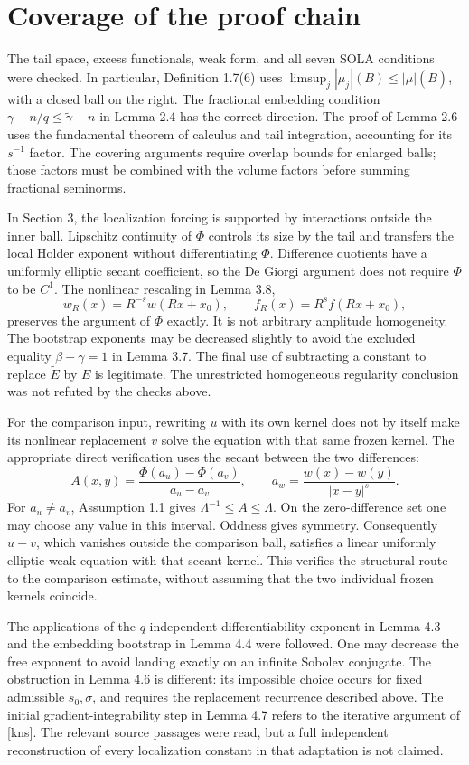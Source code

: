 \documentclass[10pt]{article}
\begin{document}
\section*{Coverage of the proof chain}
The tail space, excess functionals, weak form, and all seven SOLA conditions were checked. In particular, Definition 1.7(6) uses \(\limsup_j|\mu_j|(B)\leq|\mu|(\overline B)\), with a closed ball on the right. The fractional embedding condition \(\gamma-n/q\leq\widetilde\gamma-n\) in Lemma 2.4 has the correct direction. The proof of Lemma 2.6 uses the fundamental theorem of calculus and tail integration, accounting for its \(s^{-1}\) factor. The covering arguments require overlap bounds for enlarged balls; those factors must be combined with the volume factors before summing fractional seminorms.\par
In Section 3, the localization forcing is supported by interactions outside the inner ball. Lipschitz continuity of \(\Phi\) controls its size by the tail and transfers the local Holder exponent without differentiating \(\Phi\). Difference quotients have a uniformly elliptic secant coefficient, so the De Giorgi argument does not require \(\Phi\) to be \(C^1\). The nonlinear rescaling in Lemma 3.8, \[w_R(x)=R^{-s}w(Rx+x_0),\qquad f_R(x)=R^sf(Rx+x_0),\] preserves the argument of \(\Phi\) exactly. It is not arbitrary amplitude homogeneity. The bootstrap exponents may be decreased slightly to avoid the excluded equality \(\beta+\gamma=1\) in Lemma 3.7. The final use of subtracting a constant to replace \(\widetilde E\) by \(E\) is legitimate. The unrestricted homogeneous regularity conclusion was not refuted by the checks above.\par
For the comparison input, rewriting \(u\) with its own kernel does not by itself make its nonlinear replacement \(v\) solve the equation with that same frozen kernel. The appropriate direct verification uses the secant between the two differences: \[A(x,y)=
 \frac{\Phi(a_u)-\Phi(a_v)}{a_u-a_v},\qquad
 a_w=\frac{w(x)-w(y)}{|x-y|^s}.\] For \(a_u\ne a_v\), Assumption 1.1 gives \(\Lambda^{-1}\leq A\leq\Lambda\). On the zero-difference set one may choose any value in this interval. Oddness gives symmetry. Consequently \(u-v\), which vanishes outside the comparison ball, satisfies a linear uniformly elliptic weak equation with that secant kernel. This verifies the structural route to the comparison estimate, without assuming that the two individual frozen kernels coincide.\par
The applications of the \(q\)-independent differentiability exponent in Lemma 4.3 and the embedding bootstrap in Lemma 4.4 were followed. One may decrease the free exponent to avoid landing exactly on an infinite Sobolev conjugate. The obstruction in Lemma 4.6 is different: its impossible choice occurs for fixed admissible \(s_0,\sigma\), and requires the replacement recurrence described above. The initial gradient-integrability step in Lemma 4.7 refers to the iterative argument of [kns]. The relevant source passages were read, but a full independent reconstruction of every localization constant in that adaptation is not claimed.\par
\end{document}
